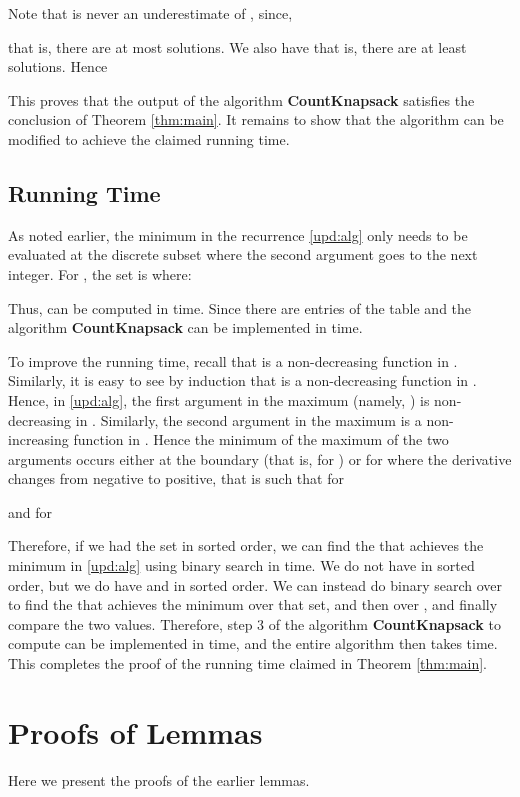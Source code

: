 \documentclass[11pt]{article}
\begin{document}
Note that  is never an underestimate of , since,

that is, there are at most  solutions. We also have
 that is, there are at least  solutions.
Hence


This proves that the output  of the algorithm {\bf CountKnapsack}
satisfies the conclusion of Theorem \ref{thm:main}.
It remains to show that the algorithm can be modified to achieve the
claimed running time.

\subsection{Running Time}

As noted earlier, the minimum in the
recurrence \eqref{upd:alg} only needs to be evaluated at the discrete subset 
where the second argument goes to the next integer.
For ,
the set  is  where:

Thus,  can be computed in  time.  Since
there are  entries of the table and  the
algorithm {\bf CountKnapsack} can be implemented in  time.

To improve the running time, recall that  is a non-decreasing function in .
Similarly, it is easy to see by induction that  is a non-decreasing
function in .  Hence, in \eqref{upd:alg}, the first argument in the
maximum (namely, )
is non-decreasing in .
Similarly, the second argument in the maximum is a non-increasing function in .
Hence
the minimum of the maximum of the two arguments occurs either at
the boundary (that is, for ) or for  where the derivative changes from negative to positive,
that is  such that for 

and for 

Therefore, if we had the set  in sorted order, we can find the
 that achieves the minimum in \eqref{upd:alg} using binary
search in  time.  We do not have  in sorted order,
but we do have  and  in sorted order. We can instead do
binary search over  to find the  that achieves
the minimum over that set, and then over , and finally
compare the two values. Therefore, step 3 of the algorithm {\bf
CountKnapsack} to compute  can be implemented in
 time, and the entire algorithm then takes
 time. This completes the proof of
the running time claimed in Theorem \ref{thm:main}.


\section{Proofs of Lemmas}
\label{sec:proofs}

Here we present the proofs of the earlier lemmas.
\end{document}
